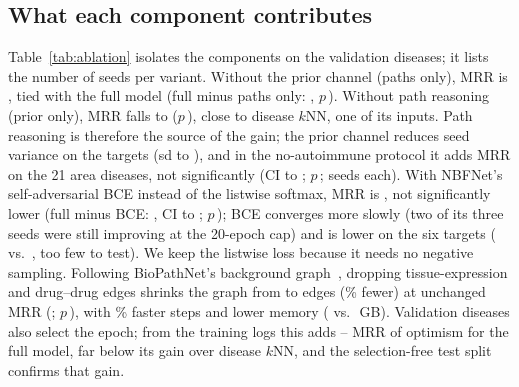\documentclass[journal]{IEEEtran}
\begin{document}
\subsection{What each component contributes}
\label{sec:aim3}
Table~\ref{tab:ablation} isolates the components on the validation diseases; it lists the number of seeds per variant. Without the prior channel (paths only), MRR is \PathsValidMrr{}, tied with the full model (full minus paths only: \DiffMainPathsValid, $p$\,\PwilMainPathsValid). Without path reasoning (prior only), MRR falls to \PriorValidMrr{} ($p$\,\PwilMainPriorValid), close to disease $k$NN, one of its inputs. Path reasoning is therefore the source of the gain; the prior channel reduces seed variance on the targets (sd \PathsTargetsMrrSd{} to \MainTargetsMrrSd), and in the no-autoimmune protocol it adds \DiffNoautoPathsArea{} MRR on the 21 area diseases, not significantly (CI \DiffLoNoautoPathsArea{} to \DiffHiNoautoPathsArea; $p$\,\PwilNoautoPathsArea; \NoautoPathsSeeds{} seeds each). With NBFNet's self-adversarial BCE instead of the listwise softmax, MRR is \BceValidMrr{}, not significantly lower (full minus BCE: \DiffMainBceValid, CI \DiffLoMainBceValid{} to \DiffHiMainBceValid; $p$\,\PwilMainBceValid); BCE converges more slowly (two of its three seeds were still improving at the 20-epoch cap) and is lower on the six targets (\BceTargetsMrr{} vs.\ \MainTargetsMrr, too few to test). We keep the listwise loss because it needs no negative sampling. Following BioPathNet's background graph~\cite{hu2026biopathnet}, dropping tissue-expression and drug--drug edges shrinks the graph from \EdgesMain{} to \EdgesBrg{} edges (\BrgEdgeCutPct\% fewer) at unchanged MRR (\BrgValidMrr; $p$\,\PwilMainBrgValid), with \BrgSpeedupPct\% faster steps and lower memory (\PeakMemBrg{} vs.\ \PeakMemMain\,GB). Validation diseases also select the epoch; from the training logs this adds \SelGapMainMin--\SelGapMainMax{} MRR of optimism for the full model, far below its gain over disease $k$NN, and the selection-free test split confirms that gain.

\begin{table}[!t]
\centering
\caption{Ablations on the 68 validation diseases (mean $\pm$ sd over 3 seeds each). Paths only: no prior channel; prior only: no path reasoning; BRG: background relation subset. $p$: two-sided Wilcoxon on paired validation MRR vs.\ the full model.}
\label{tab:ablation}
\scriptsize
\setlength{\tabcolsep}{2.5pt}

\end{table}
\end{document}
